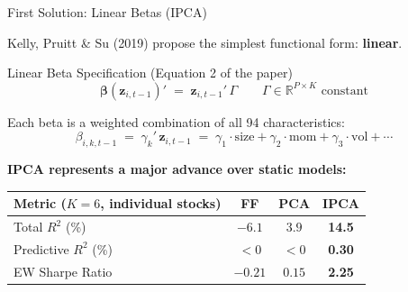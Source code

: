 \documentclass[aspectratio=169]{beamer}
\newcommand{\R}{\mathbb{R}}
\newcommand{\bz}{\bm{z}}
\newcommand{\bbeta}{\bm{\beta}}
\begin{document}
\begin{frame}{First Solution: Linear Betas (IPCA)}

Kelly, Pruitt \& Su (2019) propose the simplest functional form: \textbf{linear}.

\begin{block}{Linear Beta Specification \normalfont(Equation 2 of the paper)}
\vspace{-0.5em}
\[
  \bbeta(\bz_{i,t-1})' \;=\; \bz_{i,t-1}'\, \Gamma
  \qquad \Gamma \in \R^{P \times K} \text{ constant}
\]
\vspace{-1em}
\end{block}

Each beta is a weighted combination of all 94 characteristics:
\[
  \beta_{i,k,t-1} \;=\; \gamma_k'\, \bz_{i,t-1} \;=\; \gamma_1 \cdot \text{size} + \gamma_2 \cdot \text{mom} + \gamma_3 \cdot \text{vol} + \cdots
\]

\medskip
\textbf{IPCA represents a major advance over static models:}

\smallskip
\centering
\begin{tabular}{l ccc}
  \toprule
  \textbf{Metric} ($K=6$, individual stocks) & \textbf{FF} & \textbf{PCA} & \textbf{IPCA} \\
  \midrule
  Total $R^2$ (\%)        & \textcolor{accent}{$-6.1$} & $3.9$ & \textcolor{dgreen}{\textbf{14.5}} \\
  Predictive $R^2$ (\%)   & \textcolor{accent}{$<0$}   & \textcolor{accent}{$<0$} & \textcolor{dgreen}{\textbf{0.30}} \\
  EW Sharpe Ratio          & \textcolor{accent}{$-0.21$}& $0.15$& \textcolor{dgreen}{\textbf{2.25}} \\
  \bottomrule
\end{tabular}

\end{frame}
%
%
\end{document}
